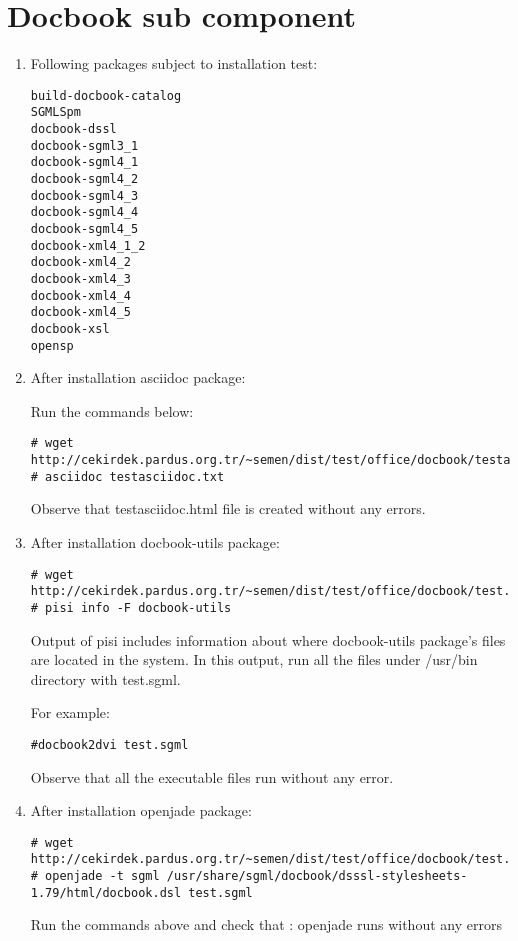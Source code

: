 \documentclass[a4paper,10pt]{article}
\begin{document}
\section{Docbook sub component}
\begin{enumerate}
 \item Following packages subject to installation test:
\begin{verbatim}
build-docbook-catalog
SGMLSpm
docbook-dssl
docbook-sgml3_1
docbook-sgml4_1
docbook-sgml4_2
docbook-sgml4_3
docbook-sgml4_4
docbook-sgml4_5
docbook-xml4_1_2
docbook-xml4_2
docbook-xml4_3
docbook-xml4_4
docbook-xml4_5
docbook-xsl
opensp
\end{verbatim}
 \item After installation asciidoc package:

Run the commands below:
\begin{verbatim}
# wget http://cekirdek.pardus.org.tr/~semen/dist/test/office/docbook/testasciidoc.txt
# asciidoc testasciidoc.txt
\end{verbatim}

Observe that testasciidoc.html file is created without any errors.

\item After installation docbook-utils package:
\begin{verbatim}
# wget http://cekirdek.pardus.org.tr/~semen/dist/test/office/docbook/test.sgml
# pisi info -F docbook-utils
\end{verbatim}

Output of pisi includes information about where docbook-utils package's files are located in the system. In this output, run all the files under /usr/bin directory with test.sgml.

For example:
\begin{verbatim}
#docbook2dvi test.sgml
\end{verbatim}

Observe that all the executable files run without any error.

\item After installation openjade package:
\begin{verbatim}
# wget http://cekirdek.pardus.org.tr/~semen/dist/test/office/docbook/test.sgml
# openjade -t sgml /usr/share/sgml/docbook/dsssl-stylesheets-1.79/html/docbook.dsl test.sgml
\end{verbatim}

Run the commands above and check that : openjade runs without any errors


\end{enumerate}
\end{document}
